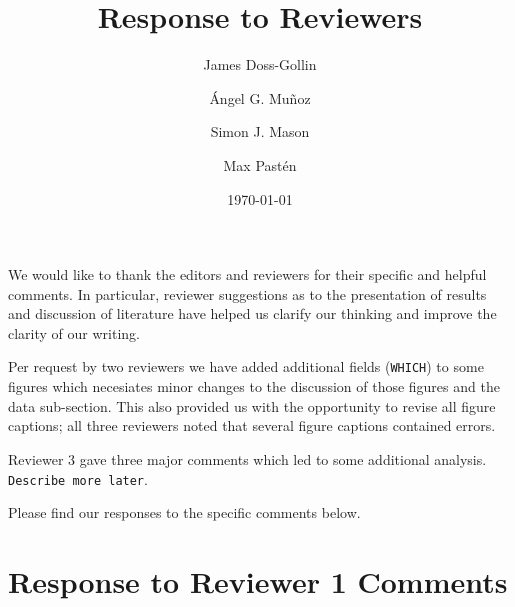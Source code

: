 \documentclass{article}
\title{Response to Reviewers}
\author{James Doss-Gollin\and \'{A}ngel G. Mu\~{n}oz  \and Simon J. Mason \and Max Past\'{e}n }
\date{\today}
\begin{document}
\maketitle

We would like to thank the editors and reviewers for their specific and helpful comments.
In particular, reviewer suggestions as to the presentation of results and discussion of literature have helped us clarify our thinking and improve the clarity of our writing.

Per request by two reviewers we have added additional fields (\texttt{WHICH}) to some figures which necesiates minor changes to the discussion of those figures and the data sub-section.
This also provided us with the opportunity to revise all figure captions; all three reviewers noted that several figure captions contained errors.

Reviewer 3 gave three major comments which led to some additional analysis.
\texttt{Describe more later}.

Please find our responses to the specific comments below.

\section{Response to Reviewer 1 Comments}
\end{document}
